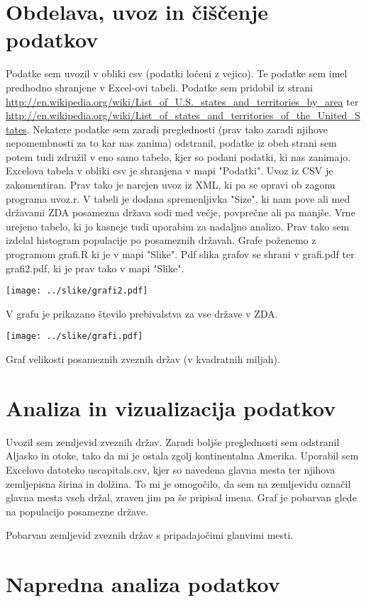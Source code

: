 \documentclass[11pt,a4paper]{article}
\begin{document}
\pagebreak

\section{Obdelava, uvoz in čiščenje podatkov}

Podatke sem uvozil v obliki csv (podatki ločeni z vejico). Te podatke sem imel predhodno shranjene v Excel-ovi tabeli. Podatke sem pridobil iz strani 
\url{http://en.wikipedia.org/wiki/List_of_U.S._states_and_territories_by_area} ter
\url{http://en.wikipedia.org/wiki/List_of_states_and_territories_of_the_United_States}. 
Nekatere podatke sem zaradi preglednosti (prav tako zaradi njihove nepomembnosti za to kar nas zanima) odstranil, podatke iz obeh strani sem potem tudi združil v eno samo tabelo, kjer so podani podatki, ki nas zanimajo. Excelova tabela v obliki csv je shranjena v mapi "Podatki".
Uvoz iz CSV je zakomentiran.
Prav tako je narejen uvoz iz XML, ki pa se opravi ob zagonu programa uvoz.r. V tabeli je dodana spremenljivka "Size", ki nam pove ali med državami ZDA posamezna država sodi med večje, povprečne ali pa manjše. Vrne urejeno tabelo, ki jo kasneje tudi uporabim za nadaljno analizo.
Prav tako sem izdelal histogram populacije po posameznih državah.
Grafe poženemo z programom grafi.R ki je v mapi "Slike". Pdf slika grafov se shrani v 
grafi.pdf ter grafi2.pdf,  ki je prav tako v mapi "Slike".

\texttt{[image: ../slike/grafi2.pdf]}

V grafu je prikazano število prebivalstva za vse države v ZDA.

\texttt{[image: ../slike/grafi.pdf]}

Graf velikosti posameznih zveznih držav (v kvadratnih miljah).

\pagebreak

\section{Analiza in vizualizacija podatkov}

Uvozil sem zemljevid zveznih držav. Zaradi boljše preglednosti sem odstranil Aljasko in otoke, tako da mi je ostala zgolj kontinentalna Amerika. Uporabil sem Excelovo datoteko uscapitals.csv, kjer so navedena glavna mesta ter njihova zemljepisna širina in dolžina. To mi je omogočilo, da sem na zemljevidu označil glavna mesta vseh držal, zraven jim pa še pripisal imena. Graf je pobarvan glede na populacijo posamezne države.

Pobarvan zemljevid zveznih držav s pripadajočimi glanvimi mesti.

\newpage
\section{Napredna analiza podatkov}
\end{document}
